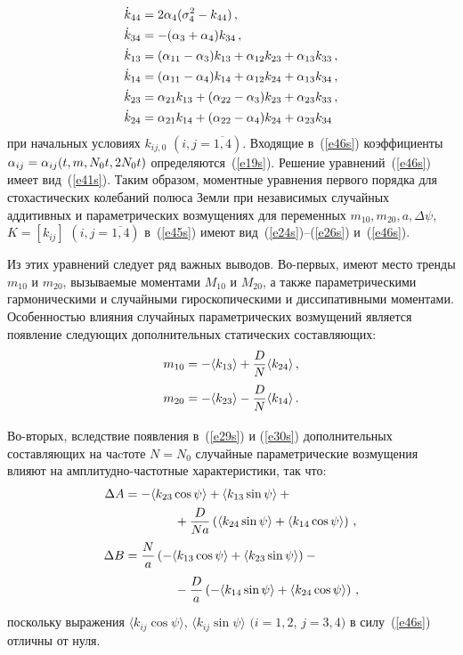 \begin{multicols}{2}
\begin{align}
 \dot k_{44} &= 2 \alpha_{4} (\sigma_4^2 - k_{44})\,,\notag\\
 \dot k_{34} &=-(\alpha_{3}+\alpha_4) k_{34}\,,\notag\\
 \dot k_{13} & = ( \alpha_{11}-\alpha_3) k_{13} +\alpha_{12} k_{23}
 + \alpha_{13} k_{33}\,,\notag\\
 \dot k_{14} & = ( \alpha_{11}-\alpha_4) k_{14} +\alpha_{12} k_{24}
 + \alpha_{13} k_{34}\,,\notag\\
 \dot k_{23} & = \alpha_{21} k_{13} +(\alpha_{22}-\alpha_3) k_{23}
 + \alpha_{23} k_{33}\,,\notag\\
 \dot k_{24} & = \alpha_{21} k_{14} +(\alpha_{22}-\alpha_4) k_{24}
 + \alpha_{23} k_{34}
 \label{e46s}
\end{align}
при начальных условиях $k_{ij,0}$ $(i,j=\overline{1,4})$. Входящие
в~(\ref{e46s}) коэффициенты $\alpha_{ij} =\alpha_{ij} (t, m, N_0 t, 2N_0 t)$
определяются~(\ref{e19s}). Решение уравнений~(\ref{e46s}) имеет вид~(\ref{e41s}). Таким
образом, моментные уравнения первого порядка для стохастических
колебаний полюса Земли при независимых случайных аддитивных и
параметрических возмущениях для переменных $m_{10}, m_{20}, a,
\Delta \psi$, $K= [ k_{ij}]$ $(i,j=\overline{1,4})$ в~(\ref{e45s}) имеют
вид~(\ref{e24s})--(\ref{e26s}) и~(\ref{e46s}).

Из этих уравнений следует ряд важных выводов. Во-первых, имеют место
тренды $m_{10}$ и $m_{20}$, вызываемые моментами $M_{10}$ и $M_{20}$,
а также параметрическими гармоническими и случайными
гироскопическими и диссипативными моментами. Особенностью влияния
случайных параметрических возмущений является появление следующих
дополнительных статических составляющих:
\begin{align*}
 m_{10} &= -\langle k_{13}\rangle + \displaystyle\frac{\displaystyle D\mathstrut}{\displaystyle  N\mathstrut} \langle k_{24}\rangle\,,\\
 m_{20} &= -\langle k_{23}\rangle - \displaystyle\frac{\displaystyle D\mathstrut}{\displaystyle  N\mathstrut} \langle k_{14}\rangle\,.
 \end{align*}

Во-вторых, вследствие появления в~(\ref{e29s}) и (\ref{e30s}) дополнительных
составляющих на чаcтоте $N=N_0$ случайные параметрические возмущения
влияют на амплитудно-частотные характеристики, так что:
\begin{align*}
\Delta A &=-\langle k_{23}\cos \psi\rangle+\langle k_{13}\sin \psi\rangle+{}\\
&\qquad\qquad{}+ \displaystyle\frac{\displaystyle D\mathstrut}{\displaystyle Na\mathstrut} \left( \langle k_{24}\sin \psi\rangle +\langle k_{14}\cos \psi\rangle\right)\,,\\
\Delta B &=\displaystyle\frac{\displaystyle N\mathstrut}{\displaystyle a\mathstrut}\left(-\langle k_{13}\cos \psi\rangle+\langle k_{23}\sin
 \psi\rangle\right)-{}\\
&\qquad\qquad{}- \displaystyle\frac{\displaystyle D\mathstrut}{\displaystyle a\mathstrut} \left( -\langle k_{14}\sin \psi\rangle +\langle k_{24}\cos \psi\rangle\right)\,,
\end{align*}
поскольку выражения $\langle k_{ij}\cos \psi\rangle$, $\langle
k_{ij}\sin \psi\rangle$ $(i=1,2$, $j=3,4)$ в силу~(\ref{e46s}) отличны от нуля.


\end{multicols}
